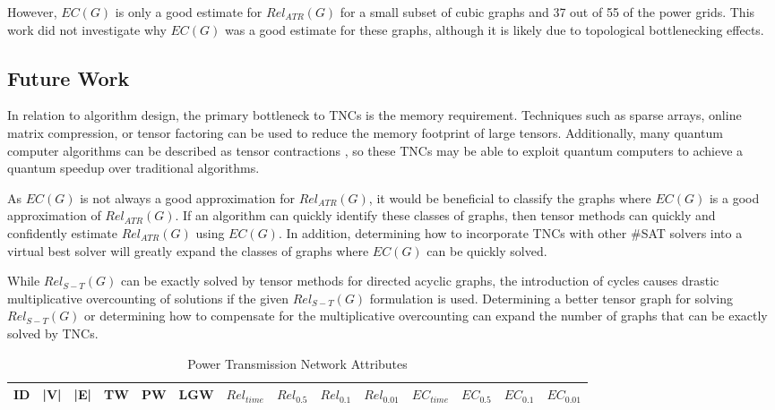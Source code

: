 However, \(EC(G)\) is only a good estimate for \(Rel_{ATR}(G)\) for a small subset of cubic graphs and 37 out of 55 of the power grids. This work did not investigate why \(EC(G)\) was a good estimate for these graphs, although it is likely due to topological bottlenecking effects.

\hypertarget{future-work}{%
\subsection{Future Work}\label{future-work}}

In relation to algorithm design, the primary bottleneck to TNCs is the memory requirement. Techniques such as sparse arrays, online matrix compression, or tensor factoring can be used to reduce the memory footprint of large tensors. Additionally, many quantum computer algorithms can be described as tensor contractions \cite{biamonte2017tensor} \cite{duenas2018quantum}, so these TNCs may be able to exploit quantum computers to achieve a quantum speedup over traditional algorithms.

As \(EC(G)\) is not always a good approximation for \(Rel_{ATR}(G)\), it would be beneficial to classify the graphs where \(EC(G)\) is a good approximation of \(Rel_{ATR}(G)\). If an algorithm can quickly identify these classes of graphs, then tensor methods can quickly and confidently estimate \(Rel_{ATR}(G)\) using \(EC(G)\). In addition, determining how to incorporate TNCs with other \#SAT solvers into a virtual best solver will greatly expand the classes of graphs where \(EC(G)\) can be quickly solved.

While \(Rel_{S-T}(G)\) can be exactly solved by tensor methods for directed acyclic graphs, the introduction of cycles causes drastic multiplicative overcounting of solutions if the given \(Rel_{S-T}(G)\) formulation is used. Determining a better tensor graph for solving \(Rel_{S-T}(G)\) or determining how to compensate for the multiplicative overcounting can expand the number of graphs that can be exactly solved by TNCs.

\begin{table}[ht]
\centering
\caption{Power Transmission Network Attributes}
\label{tab:Power Transmission Grid}
\newcolumntype{a}{X}
\renewcommand{\arraystretch}{.75}
\begin{tabularx}{\textwidth}{bbbbbbaaaaaaaa}
\toprule
ID & |V| & |E| & TW & PW & LGW & $Rel_{time}$ & $Rel_{0.5}$ & $Rel_{0.1}$ & $Rel_{0.01}$ & $EC_{time}$ & $EC_{0.5}$ & $EC_{0.1}$ & $EC_{0.01}$ \tabularnewline
\midrule

\bottomrule
\end{tabularx}
\end{table}
